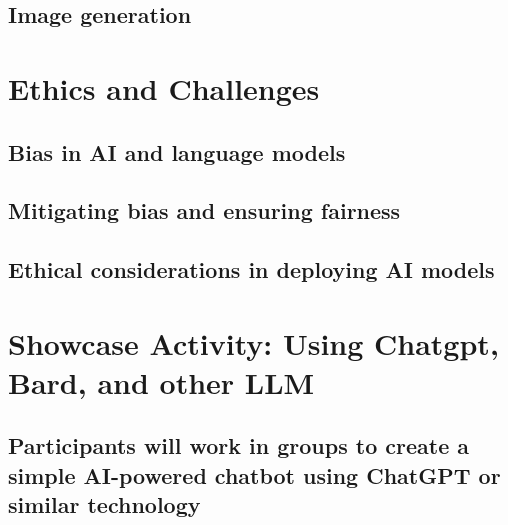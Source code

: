 \documentclass[
]{book}
\begin{document}
\hypertarget{image-generation}{%
\section*{Image generation}\label{image-generation}}

\hypertarget{ethics-and-challenges}{%
\chapter*{Ethics and Challenges}\label{ethics-and-challenges}}

\hypertarget{bias-in-ai-and-language-models}{%
\section*{Bias in AI and language models}\label{bias-in-ai-and-language-models}}

\hypertarget{mitigating-bias-and-ensuring-fairness}{%
\section*{Mitigating bias and ensuring fairness}\label{mitigating-bias-and-ensuring-fairness}}

\hypertarget{ethical-considerations-in-deploying-ai-models}{%
\section*{Ethical considerations in deploying AI models}\label{ethical-considerations-in-deploying-ai-models}}

\hypertarget{showcase-activity-using-chatgpt-bard-and-other-llm}{%
\chapter*{Showcase Activity: Using Chatgpt, Bard, and other LLM}\label{showcase-activity-using-chatgpt-bard-and-other-llm}}

\hypertarget{participants-will-work-in-groups-to-create-a-simple-ai-powered-chatbot-using-chatgpt-or-similar-technology}{%
\section*{Participants will work in groups to create a simple AI-powered chatbot using ChatGPT or similar technology}\label{participants-will-work-in-groups-to-create-a-simple-ai-powered-chatbot-using-chatgpt-or-similar-technology}}
\end{document}
